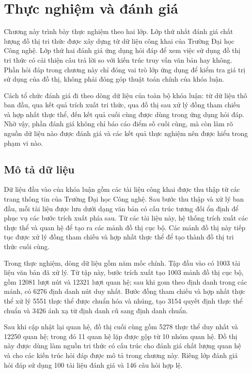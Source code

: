 \chapter{Thực nghiệm và đánh giá}

Chương này trình bày thực nghiệm theo hai lớp. Lớp thứ nhất đánh giá chất lượng đồ thị tri thức được xây dựng từ dữ liệu công khai của Trường Đại học Công nghệ. Lớp thứ hai đánh giá ứng dụng hỏi đáp để xem việc sử dụng đồ thị tri thức có cải thiện câu trả lời so với kiến trúc truy vấn văn bản hay không. Phần hỏi đáp trong chương này chỉ đóng vai trò lớp ứng dụng để kiểm tra giá trị sử dụng của đồ thị, không phải đóng góp thuật toán chính của khóa luận.

Cách tổ chức đánh giá đi theo dòng dữ liệu của toàn bộ khóa luận: từ dữ liệu thô ban đầu, qua kết quả trích xuất tri thức, qua đồ thị sau xử lý đồng tham chiếu và hợp nhất thực thể, đến kết quả cuối cùng được dùng trong ứng dụng hỏi đáp. Nhờ vậy, phần đánh giá không chỉ báo cáo điểm số cuối cùng, mà còn làm rõ nguồn dữ liệu nào được đánh giá và các kết quả thực nghiệm nên được hiểu trong phạm vi nào.

\section{Mô tả dữ liệu}

Dữ liệu đầu vào của khóa luận gồm các tài liệu công khai được thu thập từ các trang thông tin của Trường Đại học Công nghệ. Sau bước thu thập và xử lý ban đầu, mỗi tài liệu được lưu dưới dạng văn bản có cấu trúc tương đối ổn định để phục vụ các bước trích xuất phía sau. Từ các tài liệu này, hệ thống trích xuất các thực thể và quan hệ để tạo ra các mảnh đồ thị cục bộ. Các mảnh đồ thị này tiếp tục được xử lý đồng tham chiếu và hợp nhất thực thể để tạo thành đồ thị tri thức cuối cùng.

Trong thực nghiệm, dòng dữ liệu gồm năm mốc chính. Tập đầu vào có 1003 tài liệu văn bản đã xử lý. Từ tập này, bước trích xuất tạo 1003 mảnh đồ thị cục bộ, gồm 12081 lượt nút và 12321 lượt quan hệ; sau khi gom theo định danh trong các mảnh, có 6276 định danh nút duy nhất. Bước đồng tham chiếu và hợp nhất thực thể xử lý 5551 thực thể được chuẩn hóa và nhúng, tạo 3154 quyết định thực thể chuẩn và 3426 ánh xạ từ định danh cũ sang định danh chuẩn.

Sau khi cập nhật lại quan hệ, đồ thị cuối cùng gồm 5278 thực thể duy nhất và 12250 quan hệ; trong đó 11 quan hệ lặp được gộp từ 10 nhóm quan hệ. Đồ thị này được dùng làm nguồn tri thức có cấu trúc cho đánh giá chất lượng quan hệ và cho các kiến trúc hỏi đáp được mô tả trong chương này. Riêng lớp đánh giá hỏi đáp sử dụng 100 tài liệu đánh giá và 146 câu hỏi hợp lệ.


